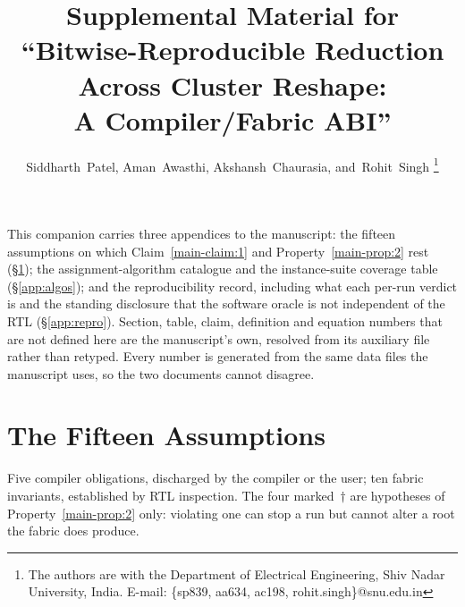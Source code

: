 \documentclass[journal,10pt]{IEEEtran}
\theoremstyle{plain}
\theoremstyle{definition}
\theoremstyle{remark}
\begin{document}
\title{Supplemental Material for\\
``Bitwise-Reproducible Reduction Across Cluster Reshape:\\
A Compiler/Fabric ABI''}

\author{%
Siddharth~Patel,
Aman~Awasthi,
Akshansh~Chaurasia,
and~Rohit~Singh%
\thanks{The authors are with the Department of Electrical Engineering, Shiv Nadar University, India.
E-mail: \{sp839, aa634, ac198, rohit.singh\}@snu.edu.in}%
}

\maketitle

\noindent
This companion carries three appendices to the manuscript: the fifteen
assumptions on which Claim~\ref{main-claim:1} and Property~\ref{main-prop:2} rest
(\S\ref{app:assumptions}); the assignment-algorithm catalogue and the
instance-suite coverage table (\S\ref{app:algos}); and the reproducibility
record, including what each per-run verdict is and the standing disclosure
that the software oracle is not independent of the RTL
(\S\ref{app:repro}). Section, table, claim, definition and equation numbers
that are not defined here are the manuscript's own, resolved from its
auxiliary file rather than retyped. Every number is generated from the same
data files the manuscript uses, so the two documents cannot disagree.

\appendices
\section{The Fifteen Assumptions}\label{app:assumptions}

Five compiler obligations, discharged by the compiler or the user; ten fabric
invariants, established by RTL inspection. The four marked~$\dagger$ are
hypotheses of Property~\ref{main-prop:2} only: violating one can stop a run but
cannot alter a root the fabric does produce.
\end{document}
